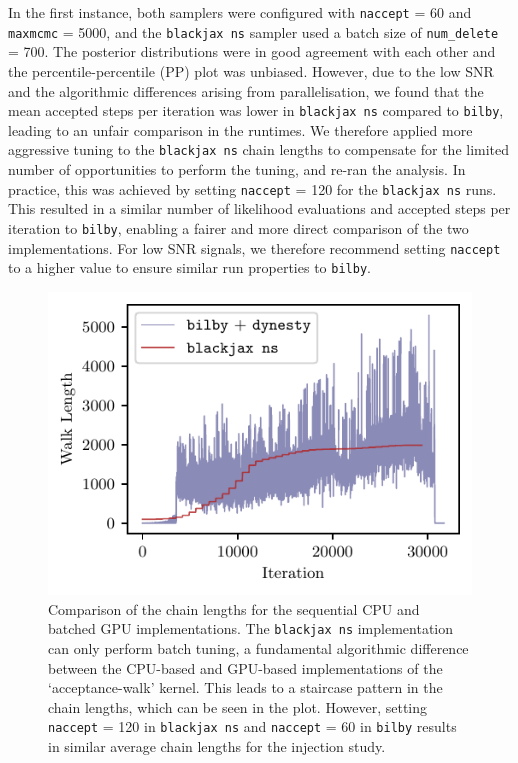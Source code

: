 \documentclass[fleqn,usenatbib]{mnras}
\begin{document}
In the first instance, both samplers were configured with
\texttt{naccept} = 60 and \texttt{maxmcmc} = 5000, and the \texttt{blackjax ns}
sampler used a batch size of \texttt{num\_delete} = 700. The posterior
distributions were in good agreement with each other and the 
percentile-percentile (PP) plot was unbiased. However, due to the low SNR and 
the algorithmic differences arising from parallelisation,
we found that the mean accepted steps per iteration was lower in \texttt{blackjax ns}
compared to \texttt{bilby}, leading to an unfair comparison in the runtimes. We therefore applied more aggressive tuning to the 
\texttt{blackjax ns} chain lengths to compensate for the limited number of opportunities
to perform the tuning, and re-ran the analysis. In practice, this was achieved by setting \texttt{naccept} = 120
for the \texttt{blackjax ns} runs. This resulted in a similar number of likelihood evaluations
and accepted steps per iteration to \texttt{bilby}, enabling a fairer and more direct comparison
of the two implementations. 
For low SNR signals, we therefore recommend setting \texttt{naccept} to a higher value to ensure
similar run properties to \texttt{bilby}.

\begin{figure}
    \centering
    \includegraphics{figures/chain_length_comparison.pdf}
    \caption{Comparison of the chain lengths for the sequential CPU and batched GPU implementations.
   The \texttt{blackjax ns} implementation can only perform batch tuning, a fundamental algorithmic difference 
   between the CPU-based and GPU-based implementations of the `acceptance-walk' kernel. This leads to a staircase
   pattern in the chain lengths, which can be seen in the plot. However, setting \texttt{naccept} = 120 in \texttt{blackjax ns}
   and \texttt{naccept} = 60 in \texttt{bilby} results in similar average chain lengths for the injection study.}
    \label{fig:chain_length_comparison}
\end{figure}
\end{document}
